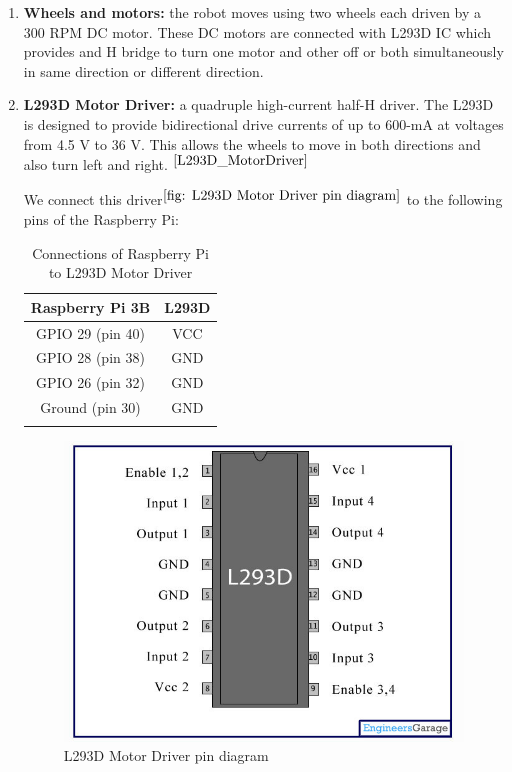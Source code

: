 \begin{enumerate}[topsep=-2pt, itemsep=2pt]
			
		
		
		
			
		\clearpage
		
		\item \textbf{Wheels and motors:} the robot moves using two wheels each driven by a 300 RPM DC motor. These DC motors are connected with L293D IC which provides and H bridge to turn one motor and other off or both simultaneously in same direction or different direction. 
		
		
		\item \textbf{L293D Motor Driver:} a quadruple high-current half-H driver. The L293D is designed to provide bidirectional drive currents of up to 600-mA at voltages from 4.5 V to 36 V. This allows the wheels to move in both directions and also turn left and right. ${}^{\cite{L293D_MotorDriver}}$
		
		
			We connect this driver${}^{\ref{fig: L293D Motor Driver pin diagram}}$ to the following pins of the Raspberry Pi:
	
			\tabulinesep=6pt	%
			\begin{longtabu} to \textwidth {| c | c | } \hline
				\centering 
				Raspberry Pi 3B & L293D \\ \hline
				GPIO 29 (pin 40) & VCC \\ 
				GPIO 28 (pin 38) & GND \\ 
				GPIO 26 (pin 32) & GND \\ 
				Ground (pin 30) & GND \\ \hline
				\caption{Connections of Raspberry Pi to L293D Motor Driver}
			\end{longtabu}
			
			\begin{figure}[!h]
				\centering
				\includegraphics[width=0.5\linewidth]{"./L293D.jpg"}
				\caption{L293D Motor Driver pin diagram}
				\label{fig: L293D Motor Driver pin diagram}
			\end{figure}
			

\end{enumerate}
